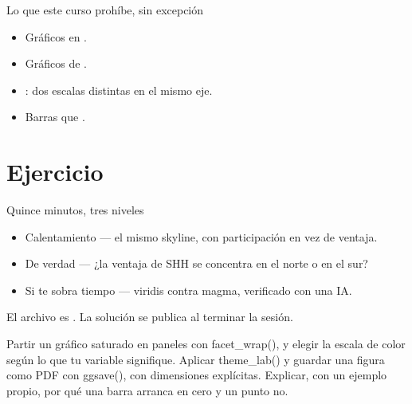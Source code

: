 \begin{frame}{Lo que este curso prohíbe, sin excepción}
  \vspace{0.3em}
  \begin{itemize}\setlength{\itemsep}{0.9em}
    \item<1-> Gráficos en .
    \item<2-> Gráficos de .
    \item<3-> : dos escalas distintas en el mismo eje.
    \item<4-> Barras que .
  \end{itemize}

  \vspace{1.1em}
\end{frame}

\section{Ejercicio}

\begin{frame}{Quince minutos, tres niveles}
  \vspace{0.4em}
  \begin{itemize}\setlength{\itemsep}{1.0em}
    \item \ac{Calentamiento} — el mismo skyline, con participación en vez
          de ventaja.
    \item \ac{De verdad} — ¿la ventaja de SHH se concentra en el norte o
          en el sur?
    \item \ac{Si te sobra tiempo} — viridis contra magma, verificado con
          una IA.
  \end{itemize}

  \vspace{1.2em}
  {\small\color{grisTenue}El archivo es . La
  solución se publica al terminar la sesión.}
\end{frame}

\yasabemos
  {Partir un gráfico saturado en paneles con facet\_wrap(), y elegir la
   escala de color según lo que tu variable signifique.}
  {Aplicar theme\_lab() y guardar una figura como PDF con ggsave(), con
   dimensiones explícitas.}
  {Explicar, con un ejemplo propio, por qué una barra arranca en cero y
   un punto no.}



